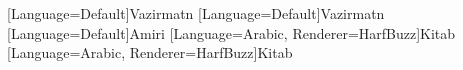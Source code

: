 [Language=Default]{Vazirmatn}
[Language=Default]{Vazirmatn}
[Language=Default]{Amiri}
[Language=Arabic, Renderer=HarfBuzz]{Kitab} %
[Language=Arabic, Renderer=HarfBuzz]{Kitab} %



%
%
%
%


